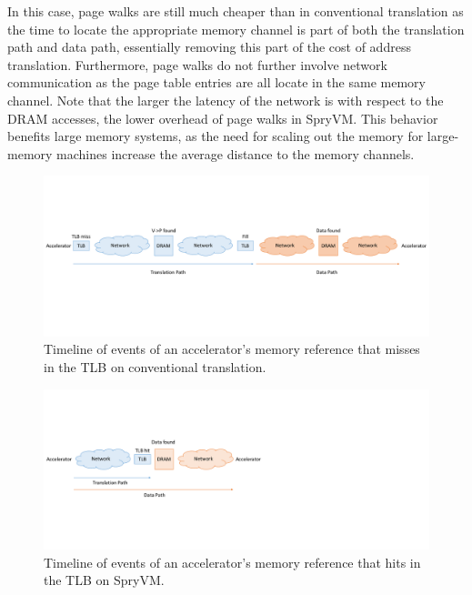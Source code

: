 In this case, page walks are still much cheaper than in conventional translation as the time to locate the appropriate memory channel is part of both the translation path and data path, essentially removing this part of the cost of address translation. Furthermore, page walks do not further involve network communication as the page table entries are all locate in the same memory channel. Note that the larger the latency of the network is with respect to the DRAM accesses, the lower overhead of page walks in SpryVM. This behavior benefits large memory systems, as the need for scaling out the memory for large-memory machines increase the average distance to the memory channels. 


\begin{figure}
	\includegraphics[width=\textwidth]{figures/time_event_base.pdf}
	\caption{Timeline of events of an accelerator's memory reference that misses in the TLB on conventional translation.}
	\label{fig:pagewalk_base}
\end{figure}

\begin{figure}
	\includegraphics[width=\textwidth]{figures/time_event_partition_hit.pdf}
	\caption{Timeline of events of an accelerator's memory reference that hits in the TLB on SpryVM.}
	\label{fig:pagewalk_partition_hit}
\end{figure}

